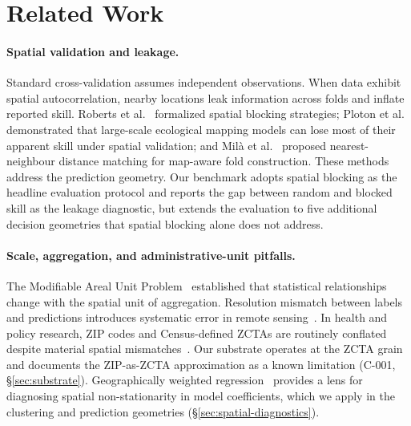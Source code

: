 \section{Related Work}
\label{sec:related}

\paragraph{Spatial validation and leakage.}
Standard cross-validation assumes independent observations. When data
exhibit spatial autocorrelation, nearby locations leak information
across folds and inflate reported skill. Roberts et
al.~\cite{roberts2017cv} formalized spatial blocking strategies;
Ploton et al.~\cite{ploton2020spatial} demonstrated that large-scale
ecological mapping models can lose most of their apparent skill under
spatial validation; and Mil\`{a} et al.~\cite{mila2022nndm} proposed
nearest-neighbour distance matching for map-aware fold construction.
These methods address the prediction geometry. Our benchmark adopts
spatial blocking as the headline evaluation protocol and reports the
gap between random and blocked skill as the leakage diagnostic, but
extends the evaluation to five additional decision geometries that
spatial blocking alone does not address.

\paragraph{Scale, aggregation, and administrative-unit pitfalls.}
The Modifiable Areal Unit Problem~\cite{openshaw1984maup} established
that statistical relationships change with the spatial unit of
aggregation. Resolution mismatch between labels and predictions
introduces systematic error in remote sensing~\cite{workman2022resolution}.
In health and policy research, ZIP codes and Census-defined ZCTAs are
routinely conflated despite material spatial
mismatches~\cite{krieger2002zip, chen2025crosswalk}. Our substrate
operates at the ZCTA grain and documents the ZIP-as-ZCTA approximation
as a known limitation (C-001, \S\ref{sec:substrate}). Geographically
weighted regression~\cite{brunsdon1996gwr} provides a lens for
diagnosing spatial non-stationarity in model coefficients, which we
apply in the clustering and prediction geometries
(\S\ref{sec:spatial-diagnostics}).

